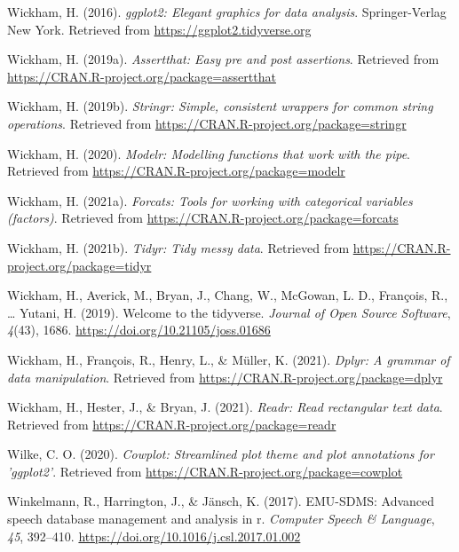 \documentclass[
  11pt,
  english,
  man,floatsintext]{apa6}
\newlength{\cslhangindent}
\newlength{\cslentryspacingunit} %
\newenvironment{CSLReferences}[2] %
 {%
  \setlength{\parindent}{0pt}
  \ifodd #1
  \let\oldpar\par
  \def\par{\hangindent=\cslhangindent\oldpar}
  \fi
  \setlength{\parskip}{#2\cslentryspacingunit}
 }%
 {}
\begin{document}
\begin{CSLReferences}{1}{0}
\leavevmode{}%
Wickham, H. (2016). \emph{ggplot2: Elegant graphics for data analysis}. Springer-Verlag New York. Retrieved from \url{https://ggplot2.tidyverse.org}

\leavevmode{}%
Wickham, H. (2019a). \emph{Assertthat: Easy pre and post assertions}. Retrieved from \url{https://CRAN.R-project.org/package=assertthat}

\leavevmode{}%
Wickham, H. (2019b). \emph{Stringr: Simple, consistent wrappers for common string operations}. Retrieved from \url{https://CRAN.R-project.org/package=stringr}

\leavevmode{}%
Wickham, H. (2020). \emph{Modelr: Modelling functions that work with the pipe}. Retrieved from \url{https://CRAN.R-project.org/package=modelr}

\leavevmode{}%
Wickham, H. (2021a). \emph{Forcats: Tools for working with categorical variables (factors)}. Retrieved from \url{https://CRAN.R-project.org/package=forcats}

\leavevmode{}%
Wickham, H. (2021b). \emph{Tidyr: Tidy messy data}. Retrieved from \url{https://CRAN.R-project.org/package=tidyr}

\leavevmode{}%
Wickham, H., Averick, M., Bryan, J., Chang, W., McGowan, L. D., François, R., \ldots{} Yutani, H. (2019). Welcome to the {tidyverse}. \emph{Journal of Open Source Software}, \emph{4}(43), 1686. \url{https://doi.org/10.21105/joss.01686}

\leavevmode{}%
Wickham, H., François, R., Henry, L., \& Müller, K. (2021). \emph{Dplyr: A grammar of data manipulation}. Retrieved from \url{https://CRAN.R-project.org/package=dplyr}

\leavevmode{}%
Wickham, H., Hester, J., \& Bryan, J. (2021). \emph{Readr: Read rectangular text data}. Retrieved from \url{https://CRAN.R-project.org/package=readr}

\leavevmode{}%
Wilke, C. O. (2020). \emph{Cowplot: Streamlined plot theme and plot annotations for 'ggplot2'}. Retrieved from \url{https://CRAN.R-project.org/package=cowplot}

\leavevmode{}%
Winkelmann, R., Harrington, J., \& Jänsch, K. (2017). EMU-SDMS: Advanced speech database management and analysis in r. \emph{Computer Speech \& Language}, \emph{45}, 392--410. \url{https://doi.org/10.1016/j.csl.2017.01.002}


\end{CSLReferences}
\end{document}
